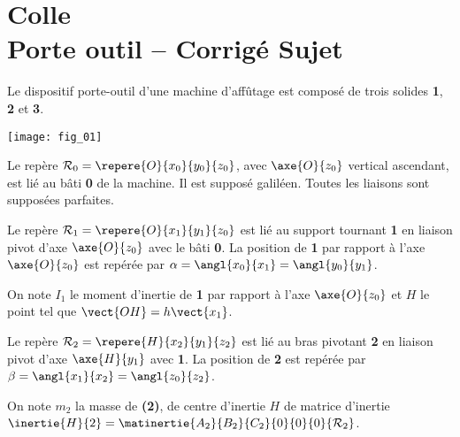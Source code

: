 \chapter*{Colle  \\ 
Porte outil -- \ifprof Corrigé \else Sujet \fi}

\iflivret {} \else
\ifprof  {} \else \fi
\fi

\setcounter{question}{0}


Le dispositif porte-outil d'une machine d'affûtage est composé de trois solides \textbf{1}, \textbf{2} et \textbf{3}. 

\begin{marginfigure}
\texttt{[image: fig\_01]}
\end{marginfigure}

Le repère $\mathcal{R}_0=\repere{O}{x_0}{y_0}{z_0}$, avec $\axe{O}{{z_0}}$ vertical ascendant, est lié au bâti \textbf{0} de la machine. Il est supposé galiléen. Toutes les liaisons sont supposées parfaites.

Le repère $\mathcal{R}_1=\repere{O}{x_1}{y_1}{z_0}$ est lié au support tournant \textbf{1} en liaison pivot d'axe $\axe{O}{z_0}$ avec le bâti \textbf{0}. La position de \textbf{1} par rapport à l'axe $\axe{O}{z_0}$ est repérée par $\alpha=\angl{x_0}{x_1}=\angl{y_0}{y_1}$. 

On note $I_1$ le moment d'inertie de \textbf{1} par rapport à l'axe $\axe{O}{z_0}$ et $H$ le point tel que $\vect{OH}=h\vect{x_1}$.

Le repère $\mathcal{R}_2=\repere{H}{x_2}{y_1}{z_2}$ est lié au bras pivotant \textbf{2} en liaison pivot d'axe $\axe{H}{{y_1}}$ avec \textbf{1}. La position de \textbf{2} est repérée par $\beta=\angl{x_1}{x_2}=\angl{z_0}{z_2}$. 

On note $m_2$ la masse de \textbf{(2)}, de centre d'inertie $H$ de matrice d'inertie $\inertie{H}{2}=\matinertie{A_2}{B_2}{C_2}{0}{0}{0}{\mathcal{R}_2}$.

